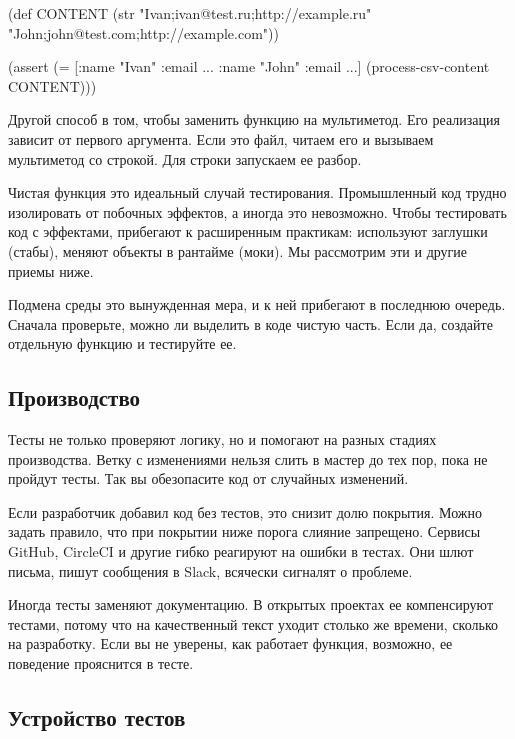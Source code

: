 \begin{english}
  \begin{clojure}
(def CONTENT
  (str "Ivan;ivan@test.ru;http://example.ru"
       \newline
       "John;john@test.com;http://example.com"))

(assert (= [{:name "Ivan" :email ...}
            {:name "John" :email ...}]
           (process-csv-content CONTENT)))
  \end{clojure}
\end{english}

Другой способ в том, чтобы заменить функцию на мультиметод. Его реализация
зависит от первого аргумента. Если это файл, читаем его и вызываем мультиметод
со строкой. Для строки запускаем ее разбор.

Чистая функция это идеальный случай тестирования. Промышленный код трудно
изолировать от побочных эффектов, а иногда это невозможно. Чтобы тестировать код
с эффектами, прибегают к расширенным практикам: используют заглушки (стабы),
меняют объекты в рантайме (моки). Мы рассмотрим эти и другие приемы ниже.

Подмена среды это вынужденная мера, и к ней прибегают в последнюю
очередь. Сначала проверьте, можно ли выделить в коде чистую часть. Если да,
создайте отдельную функцию и тестируйте ее.

\subsection{Производство}

Тесты не только проверяют логику, но и помогают на разных стадиях
производства. Ветку с изменениями нельзя слить в мастер до тех пор, пока не
пройдут тесты. Так вы обезопасите код от случайных изменений.

Если разработчик добавил код без тестов, это снизит долю покрытия. Можно задать
правило, что при покрытии ниже порога слияние запрещено. Сервисы GitHub,
CircleCI и другие гибко реагируют на ошибки в тестах. Они шлют письма, пишут
сообщения в Slack, всячески сигналят о проблеме.

Иногда тесты заменяют документацию. В открытых проектах ее компенсируют тестами,
потому что на качественный текст уходит столько же времени, сколько на
разработку. Если вы не уверены, как работает функция, возможно, ее поведение
прояснится в тесте.

\subsection{Устройство тестов}

